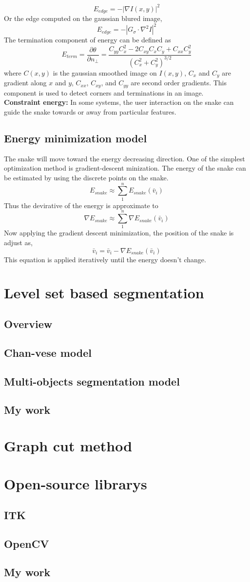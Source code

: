 $$
E_{edge} = -|\nabla I(x,y)|^2
$$
Or the edge computed on the gaussian blured image,
$$
E_{edge} = -|G_\sigma \cdot \nabla^2 I|^2
$$
The termination component of energy can be defined as
$$
E_{term} = \frac{\partial \theta}{\partial n_\perp} = \frac{C_{yy}C_x^2 - 2C_{xy}C_xC_y + C_{xx}C_y^2}{(C_x^2 + C_y^2)^{3/2}}
$$
where $C(x,y)$ is the gaussian smoothed image on $I(x,y)$, $C_x$ and $C_y$ are gradient along $x$ and $y$, $C_{xx}$, $C_{xy}$, and $C_{yy}$ are second order gradients. This component is used to detect corners and terminations in an image.\\
\textbf{Constraint energy: } In some systems, the user interaction on the snake can guide the snake towards or away from particular features. 
\subsection{Energy minimization model}
The snake will move toward the energy decreasing direction. One of the simplest optimization method is gradient-descent minization\cite{snyman2005practical}. The energy of the snake can be estimated by using the discrete points on the snake. 
$$
E_{snake} \approx \sum_1^nE_{snake}(\bar{v}_i)
$$
Thus the devirative of the energy is approximate to
$$
\nabla E_{snake} \approx \sum_1^n \nabla E_{snake}(\bar{v}_i)
$$
Now applying the gradient descent minimization, the position of the snake is adjust as,
$$
\bar{v}_i = \bar{v}_i - \nabla E_{snake}(\bar{v}_i)
$$
This equation is applied iteratively until the energy doesn't change.
\section{Level set based segmentation}
\subsection{Overview}
\subsection{Chan-vese model}
\subsection{Multi-objects segmentation model}
\subsection{My work}
\section{Graph cut method}
\section{Open-source librarys}
\subsection{ITK}
\subsection{OpenCV}
\subsection{My work}
